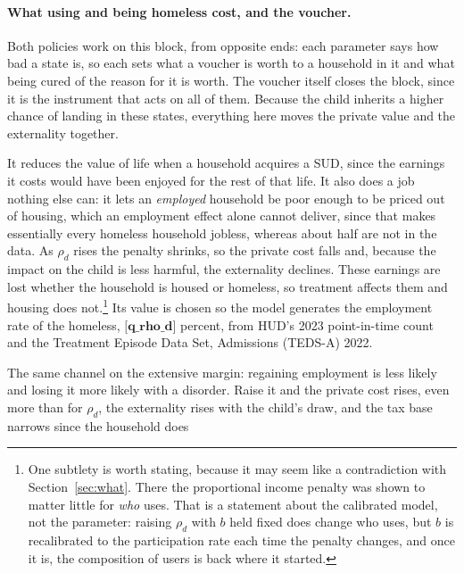 \documentclass[10pt]{article}
\begin{document}
\paragraph{What using and being homeless cost, and the voucher.} Both
policies work on this block, from opposite ends: each parameter says how bad a state
is, so each sets what a voucher is worth to a household in it and what being cured
of the reason for it is worth. The voucher itself closes the block,
since it is the instrument that acts on all of them. Because the child inherits a higher chance of landing in these
states, everything here moves the private value and the externality together.
\begin{description}\setlength{\itemsep}{0.25em}\setlength{\parskip}{0em}
\item[$\rho_d$, earnings lost to a SUD while still working.] It reduces the value
of life when a household acquires a SUD, since the earnings it costs would have
been enjoyed for the rest of that life. It also does a job nothing else can: it
lets an \emph{employed} household be poor enough to be priced out of housing, which
an employment effect alone cannot deliver, since that makes essentially
every homeless household
jobless, whereas about half are not in the data. As $\rho_d$ rises the penalty shrinks,
so the private cost falls and, because the impact on the child is less
harmful, the externality declines. These earnings are lost whether the
household is housed or homeless, so treatment affects
them and housing does not.\footnote{One subtlety is worth stating, because it may seem like
a contradiction with Section~\ref{sec:what}. There the proportional income penalty
was shown to matter little for \emph{who} uses. That is a statement about the
calibrated model, not the parameter: raising $\rho_d$ with $b$ held fixed does
change who uses, but $b$ is recalibrated to the participation rate each time the
penalty changes, and once it is, the composition of users is back where it started.}
Its value is chosen so the model generates the employment rate of the homeless,
$\textbf{[q_rho_d]}$ percent, from HUD's 2023 point-in-time count and the Treatment Episode Data Set, Admissions (TEDS-A) 2022.
\item[$\kappa_{ued}$, the employment multiplier for a SUD.] The same channel on the
extensive margin: regaining employment is less likely and losing it more likely with
a disorder. Raise it and the private cost rises, even more than for
$\rho_d$, the externality rises
with the child's draw, and the tax base narrows since the household does

\end{description}
\end{document}
